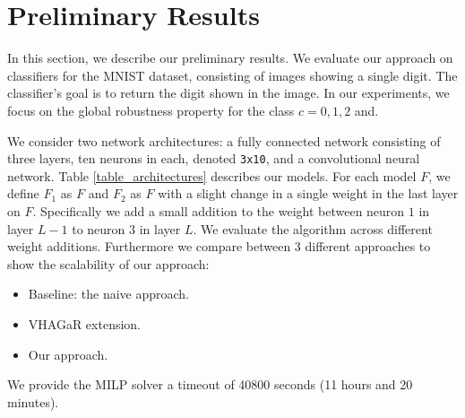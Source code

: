 
\section{Preliminary Results}
In this section, we describe our preliminary results.
We evaluate our approach on classifiers for the MNIST dataset, consisting of images showing a single digit.
The classifier's goal is to return the digit shown in the image. In our experiments, we focus on the global robustness property for the class $c=0,1,2$ and.

We consider two network architectures: 
a fully connected network consisting of three layers, ten neurons in each, denoted \texttt{3x10}, and a convolutional neural network. 
Table \ref{table_architectures} describes our models. For each model $F$, we define $F_1$ as $F$ and $F_2$ as $F$ with a slight change in a single weight in the last layer on $F$. Specifically we add a small addition to the weight between neuron $1$ in layer $L-1$ to neuron $3$ in layer $L$. We evaluate the algorithm across different weight additions. 
Furthermore we compare between 3 different approaches to show the scalability of our approach:
\begin{itemize}
    \item Baseline: the naive approach.
    \item VHAGaR extension.
    \item Our approach.
\end{itemize} 
We provide the MILP solver a timeout of 40800 seconds (11 hours and 20 minutes).

\begin{table}[H]
    \centering
    \caption{The networks used for this experience.
        \label{table_architectures}}
\end{table}


